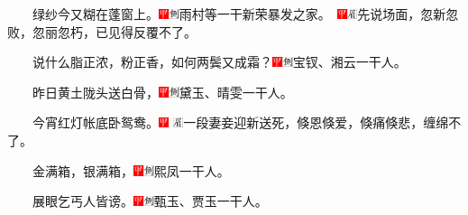 　　绿纱今又糊在蓬窗上。{\includegraphics[width=3mm]{../Images/00002}\includegraphics[width=3mm]{../Images/00011}\footnotesize 雨村等一干新荣暴发之家。　\includegraphics[width=3mm]{../Images/00002}\includegraphics[width=3mm]{../Images/00010}\footnotesize  先说场面，忽新忽败，忽丽忽朽，已见得反覆不了。}

　　说什么脂正浓，粉正香，如何两鬓又成霜？{\includegraphics[width=3mm]{../Images/00002}\includegraphics[width=3mm]{../Images/00011}\footnotesize 宝钗、湘云一干人。}

　　昨日黄土陇头送白骨，{\includegraphics[width=3mm]{../Images/00002}\includegraphics[width=3mm]{../Images/00011}\footnotesize 黛玉、晴雯一干人。}

　　今宵红灯帐底卧鸳鸯。{\includegraphics[width=3mm]{../Images/00002} \includegraphics[width=3mm]{../Images/00010}\footnotesize  一段妻妾迎新送死，倏恩倏爱，倏痛倏悲，缠绵不了。}

　　金满箱，银满箱，{\includegraphics[width=3mm]{../Images/00002}\includegraphics[width=3mm]{../Images/00011}\footnotesize 熙凤一干人。}

　　展眼乞丐人皆谤。{\includegraphics[width=3mm]{../Images/00002}\includegraphics[width=3mm]{../Images/00011}\footnotesize 甄玉、贾玉一干人。}


